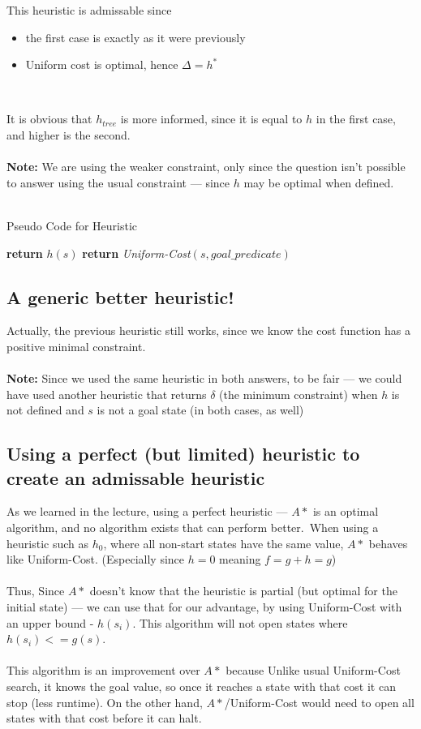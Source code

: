 \documentclass{article}
\begin{document}
This heuristic is admissable since
\begin{itemize}
\item the first case is exactly as it were previously
\item Uniform cost is optimal, hence $\Delta = h^* $
\end{itemize}
\ 

It is obvious that $h_{tree}$ is more informed, since it is equal to $h$ in the first case, and higher is the second.
\\~\\
\textbf{Note: } We are using the weaker constraint, only since the question isn't possible to answer using the usual constraint --- since $h$ may be optimal when defined.
\\~\\

\begin{algorithm}
\caption{Pseudo Code for Heuristic}
\begin{algorithmic}[1]
 
	\State \textbf{return} $h(s)$
\EndIf
\State
\State \textbf{return} \emph{Uniform-Cost}$(s, goal\_predicate)$
\EndProcedure
\end{algorithmic}
\end{algorithm}

\subsection*{A generic better heuristic!}
Actually, the previous heuristic still works, since we know the cost function has a positive minimal constraint.
\\~\\
\textbf{Note: } Since we used the same heuristic in both answers, to be fair --- we could have used another heuristic that returns $\delta$ (the minimum constraint) when $h$ is not defined and $s$ is not a goal state (in both cases, as well)

\subsection*{Using a perfect (but limited) heuristic to create an admissable heuristic}
As we learned in the lecture, using a perfect heuristic --- $A*$ is an optimal algorithm, and no algorithm exists that can perform better.\ 
When using a heuristic such as $h_0$, where all non-start states have the same value, $A*$ behaves like Uniform-Cost. (Especially since $h=0$ meaning $f=g+h=g$)
\\~\\
Thus, Since $A*$ doesn't know that the heuristic is partial (but optimal for the initial state) --- we can use that for our advantage, by using Uniform-Cost with an upper bound - $h(s_i)$. This algorithm will not open states where $h(s_i) <= g(s)$.
\\~\\
This algorithm is an improvement over $A*$ because Unlike usual Uniform-Cost search, it knows the goal value, so once it reaches a state with that cost it can stop (less runtime). On the other hand, $A*$/Uniform-Cost would need to open all states with that cost before it can halt.
\end{document}
